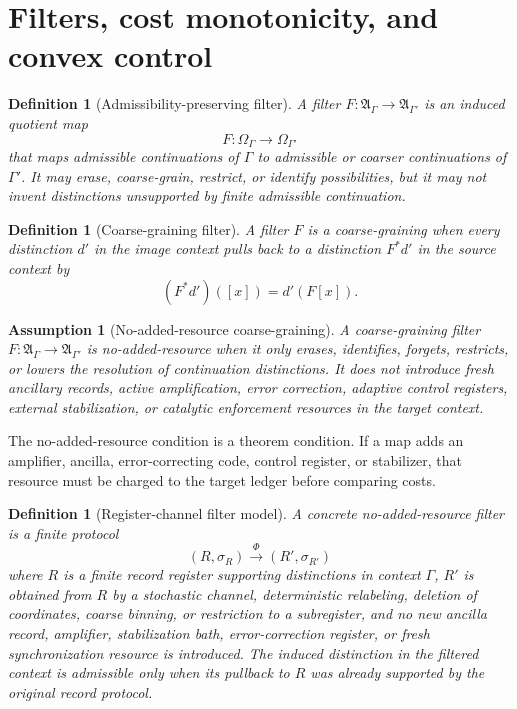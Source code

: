 \documentclass[11pt]{article}
\newtheorem{definition}[theorem]{Definition}
\newtheorem{assumption}[theorem]{Assumption}
\newcommand{\A}{\mathfrak A}
\begin{document}
\section{Filters, cost monotonicity, and convex control}\label{sec:filters-convexity}

\begin{definition}[Admissibility-preserving filter]
A filter $F:\A_\Gamma\to\A_{\Gamma'}$ is an induced quotient map
\[
 F:\Omega_\Gamma\to\Omega_{\Gamma'}
\]
that maps admissible continuations of $\Gamma$ to admissible or coarser continuations of $\Gamma'$.  It may erase, coarse-grain, restrict, or identify possibilities, but it may not invent distinctions unsupported by finite admissible continuation.
\end{definition}

\begin{definition}[Coarse-graining filter]
A filter $F$ is a coarse-graining when every distinction $d'$ in the image context pulls back to a distinction $F^*d'$ in the source context by
\[
 (F^*d')([x])=d'(F[x]).
\]
\end{definition}

\begin{assumption}[No-added-resource coarse-graining]\label{ass:no-added-resource}
A coarse-graining filter $F:\A_\Gamma\to\A_{\Gamma'}$ is \emph{no-added-resource} when it only erases, identifies, forgets, restricts, or lowers the resolution of continuation distinctions.  It does not introduce fresh ancillary records, active amplification, error correction, adaptive control registers, external stabilization, or catalytic enforcement resources in the target context.
\end{assumption}

The no-added-resource condition is a theorem condition.  If a map adds an amplifier, ancilla, error-correcting code, control register, or stabilizer, that resource must be charged to the target ledger before comparing costs.


\begin{definition}[Register-channel filter model]\label{def:register-channel-no-added}
A concrete no-added-resource filter is a finite protocol
\[
 (R,\sigma_R)\xrightarrow{\Phi} (R',\sigma_{R'})
\]
where $R$ is a finite record register supporting distinctions in context $\Gamma$, $R'$ is obtained from $R$ by a stochastic channel, deterministic relabeling, deletion of coordinates, coarse binning, or restriction to a subregister, and no new ancilla record, amplifier, stabilization bath, error-correction register, or fresh synchronization resource is introduced.  The induced distinction in the filtered context is admissible only when its pullback to $R$ was already supported by the original record protocol.
\end{definition}
\end{document}
